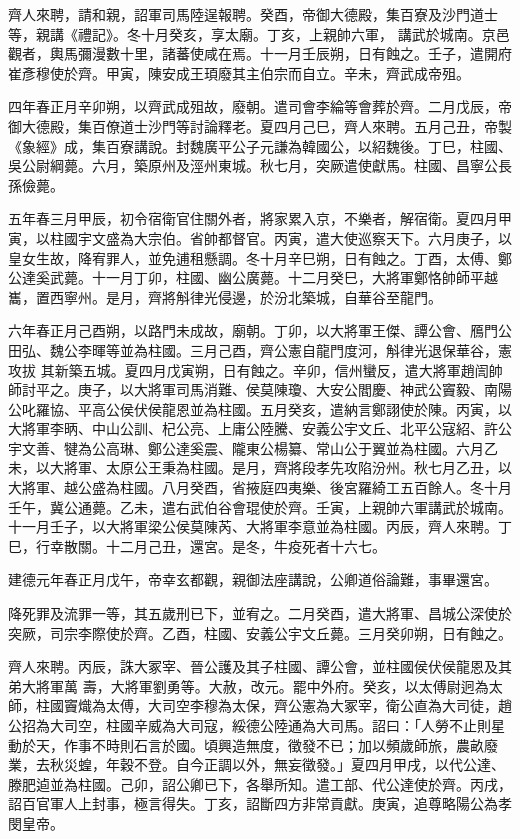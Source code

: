 \begin{pinyinscope}
 齊人來聘，請和親，詔軍司馬陸逞報聘。癸酉，帝御大德殿，集百寮及沙門道士等，親講《禮記》。冬十月癸亥，享太廟。丁亥，上親帥六軍，
 講武於城南。京邑觀者，輿馬彌漫數十里，諸蕃使咸在焉。十一月壬辰朔，日有蝕之。壬子，遣開府崔彥穆使於齊。甲寅，陳安成王頊廢其主伯宗而自立。辛未，齊武成帝殂。



 四年春正月辛卯朔，以齊武成殂故，廢朝。遣司會李綸等會葬於齊。二月戊辰，帝御大德殿，集百僚道士沙門等討論釋老。夏四月己巳，齊人來聘。五月己丑，帝製《象經》成，集百寮講說。封魏廣平公子元謙為韓國公，以紹魏後。丁巳，柱國、吳公尉綱薨。六月，築原州及涇州東城。秋七月，突厥遣使獻馬。柱國、昌寧公長孫儉薨。



 五年春三月甲辰，初令宿衛官住關外者，將家累入京，不樂者，解宿衛。夏四月甲寅，以柱國宇文盛為大宗伯。省帥都督官。丙寅，遣大使巡察天下。六月庚子，以皇女生故，降宥罪人，並免逋租懸調。冬十月辛巳朔，日有蝕之。丁酉，太傅、鄭公達奚武薨。十一月丁卯，柱國、幽公廣薨。十二月癸巳，大將軍鄭恪帥師平越巂，置西寧州。是月，齊將斛律光侵邊，於汾北築城，自華谷至龍門。



 六年春正月己酉朔，以路門未成故，廟朝。丁卯，以大將軍王傑、譚公會、鴈門公田弘、魏公李暉等並為柱國。三月己酉，齊公憲自龍門度河，斛律光退保華谷，憲攻拔
 其新築五城。夏四月戊寅朔，日有蝕之。辛卯，信州蠻反，遣大將軍趙訚帥師討平之。庚子，以大將軍司馬消難、侯莫陳瓊、大安公閻慶、神武公竇毅、南陽公叱羅協、平高公侯伏侯龍恩並為柱國。五月癸亥，遣納言鄭詡使於陳。丙寅，以大將軍李昞、中山公訓、杞公亮、上庸公陸騰、安義公宇文丘、北平公寇紹、許公宇文善、犍為公高琳、鄭公達奚震、隴東公楊纂、常山公于翼並為柱國。六月乙未，以大將軍、太原公王秉為柱國。是月，齊將段孝先攻陷汾州。秋七月乙丑，以大將軍、越公盛為柱國。八月癸酉，省掖庭四夷樂、後宮羅綺工五百餘人。冬十月
 壬午，冀公通薨。乙未，遣右武伯谷會琨使於齊。壬寅，上親帥六軍講武於城南。十一月壬子，以大將軍梁公侯莫陳芮、大將軍李意並為柱國。丙辰，齊人來聘。丁巳，行幸散關。十二月己丑，還宮。是冬，牛疫死者十六七。



 建德元年春正月戊午，帝幸玄都觀，親御法座講說，公卿道俗論難，事畢還宮。



 降死罪及流罪一等，其五歲刑已下，並宥之。二月癸酉，遣大將軍、昌城公深使於突厥，司宗李際使於齊。乙酉，柱國、安義公宇文丘薨。三月癸卯朔，日有蝕之。



 齊人來聘。丙辰，誅大冢宰、晉公護及其子柱國、譚公會，並柱國侯伏侯龍恩及其弟大將軍萬
 壽，大將軍劉勇等。大赦，改元。罷中外府。癸亥，以太傅尉迥為太師，柱國竇熾為太傅，大司空李穆為太保，齊公憲為大冢宰，衛公直為大司徒，趙公招為大司空，柱國辛威為大司寇，綏德公陸通為大司馬。詔曰：「人勞不止則星動於天，作事不時則石言於國。頃興造無度，徵發不已；加以頻歲師旅，農畝廢業，去秋災蝗，年穀不登。自今正調以外，無妄徵發。」夏四月甲戌，以代公達、滕肥逌並為柱國。己卯，詔公卿已下，各舉所知。遣工部、代公達使於齊。丙戌，詔百官軍人上封事，極言得失。丁亥，詔斷四方非常貢獻。庚寅，追尊略陽公為孝閔皇帝。




\end{pinyinscope}
